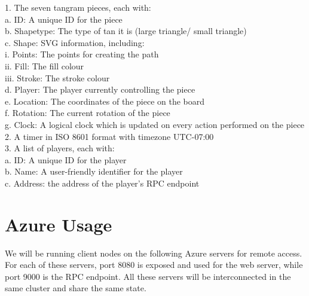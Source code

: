 \documentclass[twocolumn]{article}
\begin{document}
\begin{flushleft}
1. The seven tangram pieces, each with:\\
\hspace*{1em}a. ID: A unique ID for the piece\\
\hspace*{1em}b. Shapetype: The type of tan it is (large triangle/ small triangle)\\
\hspace*{1em}c. Shape: SVG information, including:\\
\hspace*{2em}i. Points: The points for creating the path\\
\hspace*{2em}ii. Fill: The fill colour\\
\hspace*{2em}iii. Stroke: The stroke colour\\
\hspace*{1em}d. Player: The player currently controlling the piece\\
\hspace*{1em}e. Location: The coordinates of the piece on the board\\
\hspace*{1em}f. Rotation: The current rotation of the piece\\
\hspace*{1em}g. Clock: A logical clock which is updated on every action performed on the piece\\
2. A timer in ISO 8601 format with timezone UTC-07:00\\
3. A list of players, each with:\\
\hspace*{1em}a. ID: A unique ID for the player\\
\hspace*{1em}b. Name: A user-friendly identifier for the player\\
\hspace*{1em}c. Address: the address of the player’s RPC endpoint
\end{flushleft}

\section{Azure Usage}
We will be running client nodes on the following Azure servers for remote access. For each of these servers, port 8080 is exposed and used for the web server, while port 9000 is the RPC endpoint. All these servers will be interconnected in the same cluster and share the same state.
\end{document}
